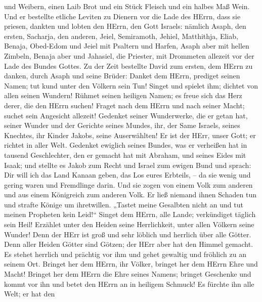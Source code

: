 und Weibern, einen Laib Brot und ein Stück Fleisch und ein halbes Maß
Wein.  Und er bestellte etliche Leviten zu Dienern vor die
Lade des HErrn, dass sie priesen, dankten und lobten den HErrn, den Gott
Israels:  nämlich Asaph, den ersten, Sacharja, den anderen,
Jeiel, Semiramoth, Jehiel, Matthithja, Eliab, Benaja, Obed-Edom und
Jeiel mit Psaltern und Harfen, Asaph aber mit hellen Zimbeln,
 Benaja aber und Jahasiel, die Priester, mit Drommeten
allezeit vor der Lade des Bundes Gottes.  Zu der Zeit
bestellte David zum ersten, dem HErrn zu danken, durch Asaph und seine
Brüder:  Danket dem HErrn, prediget seinen Namen; tut kund
unter den Völkern sein Tun!  Singet und spielet ihm; dichtet
von allen seinen Wundern!  Rühmet seinen heiligen Namen; es
freue sich das Herz derer, die den HErrn suchen!  Fraget
nach dem HErrn und nach seiner Macht; suchet sein Angesicht allezeit!
 Gedenket seiner Wunderwerke, die er getan hat, seiner
Wunder und der Gerichte seines Mundes,  ihr, der Same
Israels, seines Knechtes, ihr Kinder Jakobs, seine Auserwählten!
 Er ist der HErr, unser Gott; er richtet in aller Welt.
 Gedenket ewiglich seines Bundes, was er verheißen hat in
tausend Geschlechter,  den er gemacht hat mit Abraham, und
seines Eides mit Isaak;  und stellte es Jakob zum Recht und
Israel zum ewigen Bund  und sprach: Dir will ich das Land
Kanaan geben, das Los eures Erbteils, --  da sie wenig und
gering waren und Fremdlinge darin.  Und sie zogen von einem
Volk zum anderen und aus einem Königreich zum anderen Volk.
 Er ließ niemand ihnen Schaden tun und strafte Könige um
ihretwillen.  „Tastet meine Gesalbten nicht an und tut
meinen Propheten kein Leid!{}``  Singet dem HErrn, alle
Lande; verkündiget täglich sein Heil!  Erzählet unter den
Heiden seine Herrlichkeit, unter allen Völkern seine Wunder!
 Denn der HErr ist groß und sehr löblich und herrlich über
alle Götter.  Denn aller Heiden Götter sind Götzen; der
HErr aber hat den Himmel gemacht.  Es stehet herrlich und
prächtig vor ihm und gehet gewaltig und fröhlich zu an seinem Ort.
 Bringet her dem HErrn, ihr Völker, bringet her dem HErrn
Ehre und Macht!  Bringet her dem HErrn die Ehre seines
Namens; bringet Geschenke und kommt vor ihn und betet den HErrn an in
heiligem Schmuck!  Es fürchte ihn alle Welt; er hat den
